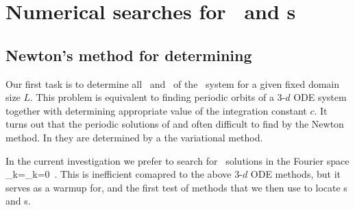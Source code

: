 %


\section{Numerical searches for \reqva\ and \rpo s}

\subsection{Newton's method for determining \reqva}
 
  Our first task is to determine all \eqva\
and  \reqva\ of the \KS\ system for a given fixed domain size
$L$.
This problem is equivalent to
finding periodic orbits of a 3-$d$ ODE system  together
with determining appropriate value of the integration constant $c$.
It turns out that the  periodic solutions of  \refeq{eq:3dks} and
often difficult to find by the Newton method. 
In  they are
determined by a the variational {\descent} method.

In the current investigation
we prefer to search for \eqv\ solutions in
the Fourier space
\beq
 	_k=_k=0
\,.
\eeq
This is inefficient comapred to the above 3-$d$ ODE methods, but
it serves as a warmup for, and the first test of methods that we then use
to locate \po s and \rpo s.

%  

